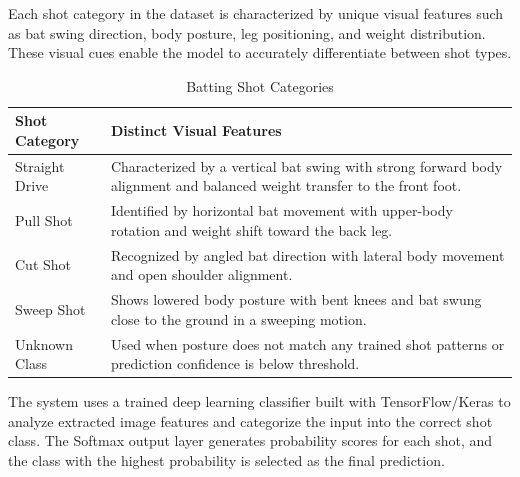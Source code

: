 Each shot category in the dataset is characterized by unique visual features such as bat swing direction, body posture, leg positioning, and weight distribution. These visual cues enable the model to accurately differentiate between shot types.
\begin{table}[h]
	\centering
	\caption{Batting Shot Categories}
	\renewcommand{\arraystretch}{1.4}
	\begin{tabular}{|p{4cm}|p{10cm}|}
		\hline
		\textbf{Shot Category} & \textbf{Distinct Visual Features} \\
		\hline
		
		Straight Drive &
		Characterized by a vertical bat swing with strong forward body alignment and balanced weight transfer to the front foot. \\
		\hline
		
		Pull Shot &
		Identified by horizontal bat movement with upper-body rotation and weight shift toward the back leg. \\
		\hline
		
		Cut Shot &
		Recognized by angled bat direction with lateral body movement and open shoulder alignment. \\
		\hline
		
		Sweep Shot &
		Shows lowered body posture with bent knees and bat swung close to the ground in a sweeping motion. \\
		\hline
		
		Unknown Class &
		Used when posture does not match any trained shot patterns or prediction confidence is below threshold. \\
		\hline
		
	\end{tabular}
\end{table}

The system uses a trained deep learning classifier built with TensorFlow/Keras to analyze extracted image features and categorize the input into the correct shot class. The Softmax output layer generates probability scores for each shot, and the class with the highest probability is selected as the final prediction.

